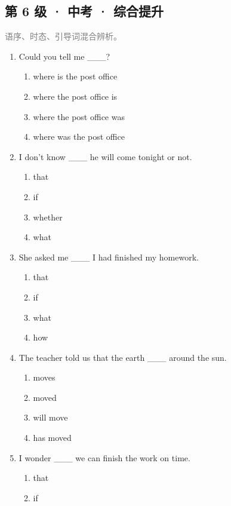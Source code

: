 \documentclass[11pt,a4paper]{ctexart}
\begin{document}
\subsection*{第 6 级 · 中考 · 综合提升}
\noindent\textcolor{gray}{语序、时态、引导词混合辨析。}\par\smallskip
\begin{enumerate}[leftmargin=*,itemsep=4pt]
\item Could you tell me \_\_\_?
\begin{enumerate}[label=\Alph*.,leftmargin=2em,itemsep=1pt,topsep=2pt]
\item where is the post office
\item where the post office is
\item where the post office was
\item where was the post office
\end{enumerate}
\item I don't know \_\_\_ he will come tonight or not.
\begin{enumerate}[label=\Alph*.,leftmargin=2em,itemsep=1pt,topsep=2pt]
\item that
\item if
\item whether
\item what
\end{enumerate}
\item She asked me \_\_\_ I had finished my homework.
\begin{enumerate}[label=\Alph*.,leftmargin=2em,itemsep=1pt,topsep=2pt]
\item that
\item if
\item what
\item how
\end{enumerate}
\item The teacher told us that the earth \_\_\_ around the sun.
\begin{enumerate}[label=\Alph*.,leftmargin=2em,itemsep=1pt,topsep=2pt]
\item moves
\item moved
\item will move
\item has moved
\end{enumerate}
\item I wonder \_\_\_ we can finish the work on time.
\begin{enumerate}[label=\Alph*.,leftmargin=2em,itemsep=1pt,topsep=2pt]
\item that
\item if

\end{enumerate}
\end{enumerate}
\end{document}
